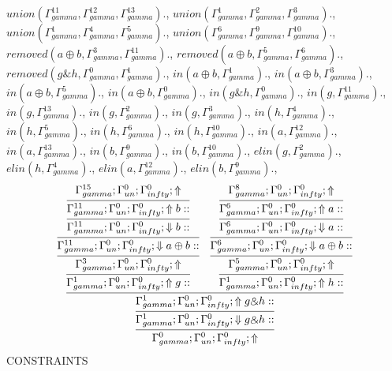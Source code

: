 \documentclass[a4paper, 11pt]{article}
\begin{document}
$union(\Gamma_{gamma}^{11}, \Gamma_{gamma}^{12}, \Gamma_{gamma}^{13}).$, $union(\Gamma_{gamma}^{1}, \Gamma_{gamma}^{2}, \Gamma_{gamma}^{3}).$, $union(\Gamma_{gamma}^{1}, \Gamma_{gamma}^{4}, \Gamma_{gamma}^{5}).$, $union(\Gamma_{gamma}^{6}, \Gamma_{gamma}^{9}, \Gamma_{gamma}^{10}).$, $removed(a \oplus b, \Gamma_{gamma}^{3}, \Gamma_{gamma}^{11}).$, $removed(a \oplus b, \Gamma_{gamma}^{5}, \Gamma_{gamma}^{6}).$, $removed(g \binampersand h, \Gamma_{gamma}^{0}, \Gamma_{gamma}^{1}).$, $in(a \oplus b, \Gamma_{gamma}^{1}).$, $in(a \oplus b, \Gamma_{gamma}^{3}).$, $in(a \oplus b, \Gamma_{gamma}^{5}).$, $in(a \oplus b, \Gamma_{gamma}^{0}).$, $in(g \binampersand h, \Gamma_{gamma}^{0}).$, $in(g, \Gamma_{gamma}^{11}).$, $in(g, \Gamma_{gamma}^{13}).$, $in(g, \Gamma_{gamma}^{2}).$, $in(g, \Gamma_{gamma}^{3}).$, $in(h, \Gamma_{gamma}^{4}).$, $in(h, \Gamma_{gamma}^{5}).$, $in(h, \Gamma_{gamma}^{6}).$, $in(h, \Gamma_{gamma}^{10}).$, $in(a, \Gamma_{gamma}^{12}).$, $in(a, \Gamma_{gamma}^{13}).$, $in(b, \Gamma_{gamma}^{9}).$, $in(b, \Gamma_{gamma}^{10}).$, $elin(g, \Gamma_{gamma}^{2}).$, $elin(h, \Gamma_{gamma}^{4}).$, $elin(a, \Gamma_{gamma}^{12}).$, $elin(b, \Gamma_{gamma}^{9}).$, 
\[
\infer{\Gamma_{ gamma}^{0} ; \Gamma_{un}^{0} ; \Gamma_{ infty}^{0} ;  \Uparrow }
{\infer{\Gamma_{ gamma}^{1} ; \Gamma_{un}^{0} ; \Gamma_{ infty}^{0} ;  \Downarrow g \binampersand h :: }
{\infer{\Gamma_{ gamma}^{1} ; \Gamma_{un}^{0} ; \Gamma_{ infty}^{0} ;  \Uparrow g \binampersand h :: }
{\infer{\Gamma_{ gamma}^{1} ; \Gamma_{un}^{0} ; \Gamma_{ infty}^{0} ;  \Uparrow g :: }
{\infer{\Gamma_{ gamma}^{3} ; \Gamma_{un}^{0} ; \Gamma_{ infty}^{0} ;  \Uparrow }
{\infer{\Gamma_{ gamma}^{11} ; \Gamma_{un}^{0} ; \Gamma_{ infty}^{0} ;  \Downarrow a \oplus b :: }
{\infer{\Gamma_{ gamma}^{11} ; \Gamma_{un}^{0} ; \Gamma_{ infty}^{0} ;  \Downarrow b :: }
{\infer{\Gamma_{ gamma}^{11} ; \Gamma_{un}^{0} ; \Gamma_{ infty}^{0} ;  \Uparrow b :: }
{\Gamma_{ gamma}^{15} ; \Gamma_{un}^{0} ; \Gamma_{ infty}^{0} ;  \Uparrow }}}}}
&
\infer{\Gamma_{ gamma}^{1} ; \Gamma_{un}^{0} ; \Gamma_{ infty}^{0} ;  \Uparrow h :: }
{\infer{\Gamma_{ gamma}^{5} ; \Gamma_{un}^{0} ; \Gamma_{ infty}^{0} ;  \Uparrow }
{\infer{\Gamma_{ gamma}^{6} ; \Gamma_{un}^{0} ; \Gamma_{ infty}^{0} ;  \Downarrow a \oplus b :: }
{\infer{\Gamma_{ gamma}^{6} ; \Gamma_{un}^{0} ; \Gamma_{ infty}^{0} ;  \Downarrow a :: }
{\infer{\Gamma_{ gamma}^{6} ; \Gamma_{un}^{0} ; \Gamma_{ infty}^{0} ;  \Uparrow a :: }
{\Gamma_{ gamma}^{8} ; \Gamma_{un}^{0} ; \Gamma_{ infty}^{0} ;  \Uparrow }}}}}}}}
\]
CONSTRAINTS
\end{document}
